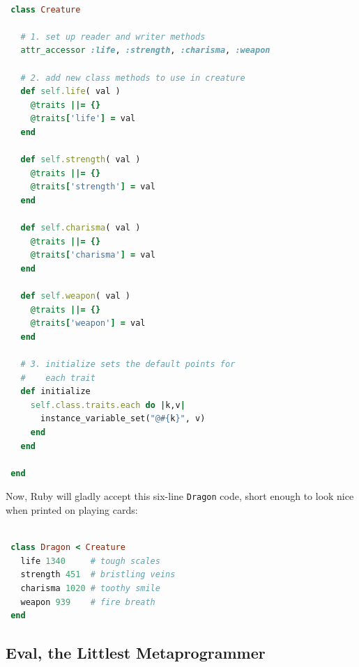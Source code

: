 \documentclass[10pt,twoside]{report}
\begin{document}
\begin{lstlisting}[basicstyle=\ttfamily\color{basiccolor},
    commentstyle = \ttfamily\color{commentcolor},
    keywordstyle=\ttfamily\color{keywordscolor},
    stringstyle=\color{stringcolor},
    language=Ruby,
    basicstyle=\small\ttfamily,
    showstringspaces=false,
  ]

 class Creature

   # 1. set up reader and writer methods
   attr_accessor :life, :strength, :charisma, :weapon

   # 2. add new class methods to use in creature
   def self.life( val )
     @traits ||= {}
     @traits['life'] = val
   end

   def self.strength( val )
     @traits ||= {}
     @traits['strength'] = val
   end

   def self.charisma( val )
     @traits ||= {}
     @traits['charisma'] = val
   end

   def self.weapon( val )
     @traits ||= {}
     @traits['weapon'] = val
   end

   # 3. initialize sets the default points for
   #    each trait
   def initialize
     self.class.traits.each do |k,v|
       instance_variable_set("@#{k}", v)
     end
   end

 end

\end{lstlisting}


Now, Ruby will gladly accept this six-line
\lstinline[breaklines=true]|Dragon| code, short enough to look nice
when printed on playing cards:


\begin{lstlisting}[basicstyle=\ttfamily\color{basiccolor},
    commentstyle = \ttfamily\color{commentcolor},
    keywordstyle=\ttfamily\color{keywordscolor},
    stringstyle=\color{stringcolor},
    language=Ruby,
    basicstyle=\small\ttfamily,
    showstringspaces=false,
  ]

 class Dragon < Creature
   life 1340     # tough scales
   strength 451  # bristling veins
   charisma 1020 # toothy smile
   weapon 939    # fire breath
 end

\end{lstlisting}




\subsection{Eval, the Littlest Metaprogrammer}
\end{document}
